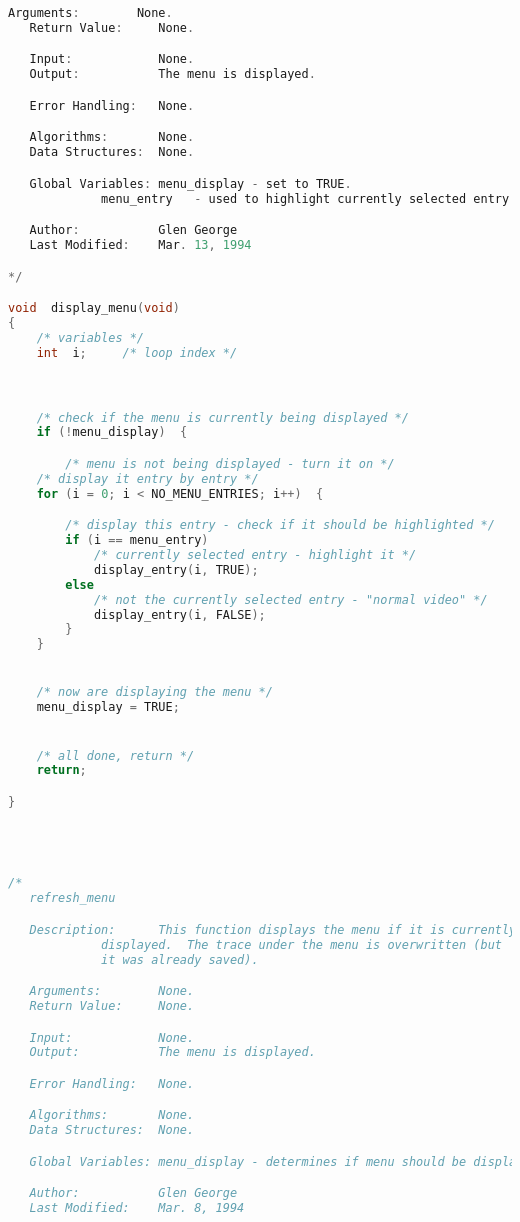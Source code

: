 \begin{lstlisting}[language=C]
   Arguments:        None.
   Return Value:     None.

   Input:            None.
   Output:           The menu is displayed.

   Error Handling:   None.

   Algorithms:       None.
   Data Structures:  None.

   Global Variables: menu_display - set to TRUE.
   		     menu_entry   - used to highlight currently selected entry.

   Author:           Glen George
   Last Modified:    Mar. 13, 1994

*/

void  display_menu(void)
{
    /* variables */
    int  i;		/* loop index */



    /* check if the menu is currently being displayed */
    if (!menu_display)  {

        /* menu is not being displayed - turn it on */
	/* display it entry by entry */
	for (i = 0; i < NO_MENU_ENTRIES; i++)  {

	    /* display this entry - check if it should be highlighted */
	    if (i == menu_entry)
	        /* currently selected entry - highlight it */
	        display_entry(i, TRUE);
	    else
	        /* not the currently selected entry - "normal video" */
	        display_entry(i, FALSE);
        }
    }


    /* now are displaying the menu */
    menu_display = TRUE;


    /* all done, return */
    return;

}




/*
   refresh_menu

   Description:      This function displays the menu if it is currently being
		     displayed.  The trace under the menu is overwritten (but
		     it was already saved).

   Arguments:        None.
   Return Value:     None.

   Input:            None.
   Output:           The menu is displayed.

   Error Handling:   None.

   Algorithms:       None.
   Data Structures:  None.

   Global Variables: menu_display - determines if menu should be displayed.

   Author:           Glen George
   Last Modified:    Mar. 8, 1994


\end{lstlisting}
